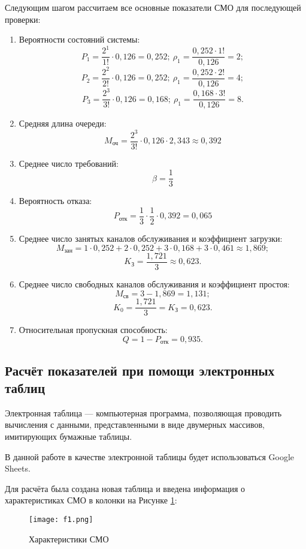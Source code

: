 \documentclass[14pt]{extarticle}
\begin{document}
    Следующим шагом рассчитаем все основные показатели СМО для последующей проверки:
    \begin{enumerate}
        \item Вероятности состояний системы:
        $$ P_1 = \frac{2^1}{1!} \cdot 0,126 = 0,252;\ \rho_1 = \frac{0,252 \cdot 1!}{0,126} = 2; $$
        $$ P_2 = \frac{2^2}{2!} \cdot 0,126 = 0,252;\ \rho_1 = \frac{0,252 \cdot 2!}{0,126} = 4; $$
        $$ P_3 = \frac{2^3}{3!} \cdot 0,126 = 0,168;\ \rho_1 = \frac{0,168 \cdot 3!}{0,126} = 8. $$

        \item Средняя длина очереди:
        $$ M_\text{оч} = \frac{2^3}{3!} \cdot 0,126 \cdot 2,343 \approx 0,392 $$

        \item Среднее число требований:
        $$ \beta = \frac{1}{3} $$

        \item Вероятность отказа:
        $$ P_\text{отк} = \frac{1}{3} \cdot \frac{1}{2} \cdot 0,392 = 0,065 $$

        \item Среднее число занятых каналов обслуживания и коэффициент загрузки:
        $$ M_\text{зан} = 1 \cdot 0,252 + 2 \cdot 0,252 + 3 \cdot 0,168 + 3 \cdot 0,461 \approx 1,869; $$
        $$ K_\text{З} = \frac{1,721}{3} \approx 0,623. $$

        \item Среднее число свободных каналов обслуживания и коэффициент простоя:
        $$ M_\text{св} = 3 - 1,869 = 1,131; $$
        $$ K_0 = \frac{1,721}{3} = K_\text{З} = 0,623.$$

        \item Относительная пропускная способность:
        $$ Q = 1 - P_\text{отк} = 0,935. $$
    \end{enumerate}

    \subsection{Расчёт показателей при помощи электронных таблиц}

    Электронная таблица --- компьютерная программа, позволяющая проводить вычисления с данными, представленными в виде двумерных массивов, имитирующих бумажные таблицы.

    В данной работе в качестве электронной таблицы будет использоваться Google Sheets.

    Для расчёта была создана новая таблица и введена информация о характеристиках СМО в колонки на Рисунке \ref{fig:chars}:
    \begin{figure}[!ht]
        \centering
        \texttt{[image: f1.png]}
        \caption{Характеристики СМО}
        \label{fig:chars}
    \end{figure}
\end{document}
